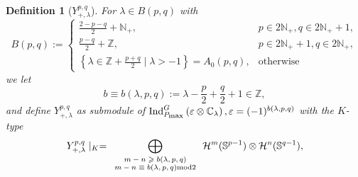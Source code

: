 \documentclass[12pt]{article} %
\theoremstyle{plain}
\newtheorem{definition}{Definition}
\theoremstyle{remark}
\newcommand{\tmscript}[1]{ {\scriptsize #1} }
\newcommand{\assign}{:=}
\newcommand{\myInd}[1]{\mbox{Ind}_{P_{\mbox{\scriptsize\rmfamily max}}}^G\left( \varepsilon\otimes \C_{#1} \right)}
\begin{document}
\begin{definition}[$Y_{+,\lambda}^{p,q}$]
	For $\lambda\in B(p,q)$ with\begin{equation*}
		B (p, q) \assign \left\{ \begin{array}{ll}
    \frac{2 - p - q}{2} +\mathbb{N}_+, & p \in 2\mathbb{N}_+, q \in
    2\mathbb{N}_+ + 1,\\
    \frac{p - q}{2} +\mathbb{Z}, & p \in 2\mathbb{N}_+ + 1, q \in
    2\mathbb{N}_+,\\
    \left\{ \lambda \in \mathbb{Z}+ \frac{p + q}{2} \mid \lambda > - 1
    \right\} = A_0 (p, q), & \mbox{otherwise}
  \end{array} \right. 
	\end{equation*}
	we let
	\begin{equation}
	b \equiv b (\lambda, p, q) \assign \lambda - \frac{p}{2} + \frac{q}{2} +
  1 \in \mathbb{Z},  \label{eqn:20-beplus} 	
	\end{equation}
	and define $Y_{+,\lambda}^{p,q}$ as submodule of $\myInd{\lambda},\varepsilon=(-1)^{b(\lambda,p,q)}$ with the $K$-type
	\begin{equation*}
		\begin{array}[]{c}
   Y_{+, \lambda}^{p, q} \mid_K = \displaystyle\bigoplus_{\tmscript{\begin{array}{c}
    m - n \geqslant b (\lambda, p, q)\\
    m - n \equiv b (\lambda, p, q) \mbox{mod} 2
  \end{array}}} \mathcal{H}^m (\mathbb{S}^{p - 1}) \otimes \mathcal{H}^n
  (\mathbb{S}^{q - 1}),\\
		\end{array}
	\end{equation*}
\end{definition}
\end{document}
